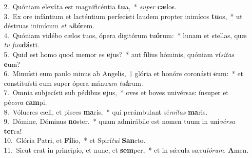 {2.~}Quóniam eleváta est magnificéntia \textbf{tu}a,~* \textit{su}\textit{per} \textbf{cæ}los.\\
{3.~}Ex ore infántium et lacténtium perfecísti laudem propter inimícos \textbf{tu}os,~* ut déstruas inimícum \textit{et} \textit{ul}\textbf{tó}rem.\\
{4.~}Quóniam vidébo cælos tuos, ópera digitórum tu\textbf{ó}rum:~* lunam et stellas, quæ \textit{tu} \textit{fun}\textbf{dá}sti.\\
{5.~}Quid est homo quod memor es \textbf{e}jus?~* aut fílius hóminis, quóniam ví\textit{si}\textit{tas} \textbf{e}um?\\
{6.~}Minuísti eum paulo minus ab Angelis,~† glória et honóre coronásti \textbf{e}um:~* et constituísti eum super ópera mánu\textit{um} \textit{tu}\textbf{á}rum.\\
{7.~}Omnia subjecísti sub pédibus \textbf{e}jus,~* oves et boves univérsas: ínsuper et pé\textit{co}\textit{ra} \textbf{cam}pi.\\
{8.~}Vólucres cæli, et pisces \textbf{ma}ris,~* qui perámbulant sé\textit{mi}\textit{tas} \textbf{ma}ris.\\
{9.~}Dómine, Dóminus \textbf{no}ster,~* quam admirábile est nomen tuum in uni\textit{vér}\textit{sa} \textbf{ter}ra!\\
{10.~}Glória Patri, et \textbf{Fí}lio,~* et Spirí\textit{tu}\textit{i} \textbf{San}cto.\\
{11.~}Sicut erat in princípio, et nunc, et \textbf{sem}per,~* et in sǽcula sæcu\textit{ló}\textit{rum}. \textbf{A}men.\\
